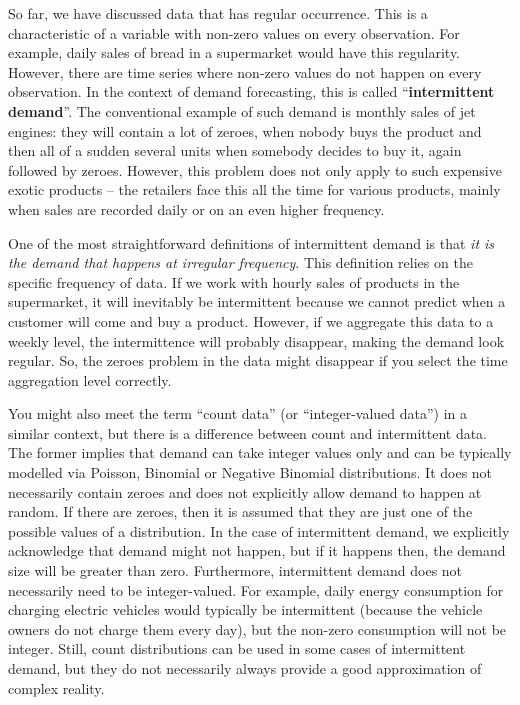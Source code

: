 \documentclass[
]{book}
\theoremstyle{definition}
\theoremstyle{definition}
\theoremstyle{definition}
\theoremstyle{definition}
\theoremstyle{remark}
\begin{document}
So far, we have discussed data that has regular occurrence. This is a characteristic of a variable with non-zero values on every observation. For example, daily sales of bread in a supermarket would have this regularity. However, there are time series where non-zero values do not happen on every observation. In the context of demand forecasting, this is called ``\textbf{intermittent demand}''. The conventional example of such demand is monthly sales of jet engines: they will contain a lot of zeroes, when nobody buys the product and then all of a sudden several units when somebody decides to buy it, again followed by zeroes. However, this problem does not only apply to such expensive exotic products -- the retailers face this all the time for various products, mainly when sales are recorded daily or on an even higher frequency.

One of the most straightforward definitions of intermittent demand is that \emph{it is the demand that happens at irregular frequency}. This definition relies on the specific frequency of data. If we work with hourly sales of products in the supermarket, it will inevitably be intermittent because we cannot predict when a customer will come and buy a product. However, if we aggregate this data to a weekly level, the intermittence will probably disappear, making the demand look regular. So, the zeroes problem in the data might disappear if you select the time aggregation level correctly.

You might also meet the term ``count data'' (or ``integer-valued data'') in a similar context, but there is a difference between count and intermittent data. The former implies that demand can take integer values only and can be typically modelled via Poisson, Binomial or Negative Binomial distributions. It does not necessarily contain zeroes and does not explicitly allow demand to happen at random. If there are zeroes, then it is assumed that they are just one of the possible values of a distribution. In the case of intermittent demand, we explicitly acknowledge that demand might not happen, but if it happens then, the demand size will be greater than zero. Furthermore, intermittent demand does not necessarily need to be integer-valued. For example, daily energy consumption for charging electric vehicles would typically be intermittent (because the vehicle owners do not charge them every day), but the non-zero consumption will not be integer. Still, count distributions can be used in some cases of intermittent demand, but they do not necessarily always provide a good approximation of complex reality.
\end{document}
